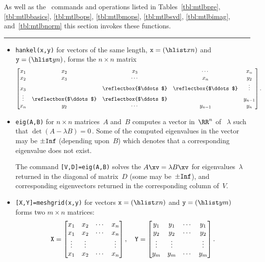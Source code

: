 \begin{draft}
\begin{table}
\caption{As well as the \script\ commands and operations listed in Tables~\ref{tbl:mtlbpre}, \ref{tbl:mtlbbasics}, \ref{tbl:mtlbops}, \ref{tbl:mtlbmops}, \ref{tbl:mtlbsvd}, \ref{tbl:mtlbimag}, and~\ref{tbl:mtlbnorm} this section invokes these functions.} \label{tbl:mtlbexpf}
\smallskip\hrule
\begin{minipage}{\linewidth}
\begin{itemize}
\item {}\verb|hankel(x,y)| for vectors of the same length, \(\verb|x|=(\hlist xn)\) and \(\verb|y|=(\hlist yn)\), forms the \(n\times n\) matrix
\def\adots{\reflectbox{$\ddots$}}
\begin{equation*}
\begin{bmatrix} 
x_1&x_2&x_3&\cdots&x_n \\
x_2&x_3&\cdots&x_n&y_2\\
x_3&&\adots&\adots&\vdots\\
\vdots&\adots&\adots&&y_{n-1}\\
x_n&y_2&\cdots&y_{n-1}&y_n
\end{bmatrix}.
\end{equation*}

\item {}\verb|eig(A,B)| for \(n\times n\) matrices~\(A\) and~\(B\) computes a vector in~\(\RR^n\) of ~\(\lambda\) such that \(\det(A-\lambda B)=0\)\,.
Some of the computed eigenvalues in the vector may be \(\pm\verb|Inf|\) (depending upon~\(B\)) which denotes that a corresponding eigenvalue does not exist.

The command \verb|[V,D]=eig(A,B)| solves the  \(A\xv=\lambda B\xv\) for eigenvalues~\(\lambda\) returned in the diagonal of matrix~\(D\) (some may be~\(\pm\verb|Inf|\)), and corresponding eigenvectors returned in the corresponding column of~\(V\).

\item {}\verb|[X,Y]=meshgrid(x,y)|  for vectors \(\verb|x|=(\hlist xn)\) and \(\verb|y|=(\hlist ym)\) forms two \(m\times n\) matrices:
\begin{equation*}
\verb|X|=\begin{bmatrix} x_1&x_2&\cdots&x_n\\
 x_1&x_2&\cdots&x_n\\
 \vdots&\vdots&&\vdots\\
 x_1&x_2&\cdots&x_n \end{bmatrix},
 \quad
\verb|Y|=\begin{bmatrix} y_1&y_1&\cdots&y_1\\
 y_2&y_2&\cdots&y_2\\
 \vdots&\vdots&&\vdots\\
 y_m&y_m&\cdots&y_m \end{bmatrix}.
\end{equation*}


\end{itemize}
\end{minipage}
\end{table}
\end{draft}
